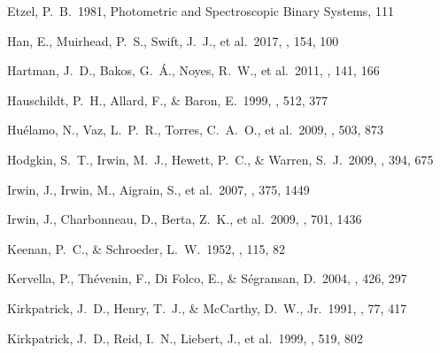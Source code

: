 \documentclass[fleqn,usenatbib]{mnras}
\begin{document}
\begin{thebibliography}{99}
 Etzel, P.~B.\ 1981, Photometric and Spectroscopic Binary Systems, 111 

 Han, E., Muirhead, P.~S., Swift, J.~J., et al.\ 2017, \aj, 154, 100

 Hartman, J.~D., Bakos, G.~{\'A}., Noyes, R.~W., et al.\ 2011, \aj, 141, 166 

 Hauschildt, P.~H., Allard, F., \& Baron, E.\ 1999, \apj, 512, 377 

 Hu{\'e}lamo, N., Vaz, L.~P.~R., Torres, C.~A.~O., et al.\ 2009, \aap, 503, 873 

 Hodgkin, S.~T., Irwin, M.~J., Hewett, P.~C., \& Warren, S.~J.\ 2009, \mnras, 394, 675 


 Irwin, J., Irwin, M., Aigrain, S., et al.\ 2007, \mnras, 375, 1449 

 Irwin, J., Charbonneau, D., Berta, Z.~K., et al.\ 2009, \apj, 701, 1436 


 Keenan, P.~C., \& Schroeder, L.~W.\ 1952, \apj, 115, 82 

 Kervella, P., Th{\'e}venin, F., Di Folco, E., \& S{\'e}gransan, D.\ 2004, \aap, 426, 297 

 Kirkpatrick, J.~D., Henry, T.~J., \& McCarthy, D.~W., Jr.\ 1991, \apjs, 77, 417 

 Kirkpatrick, J.~D., Reid, I.~N., Liebert, J., et al.\ 1999, \apj, 519, 802


\end{thebibliography}
\end{document}
